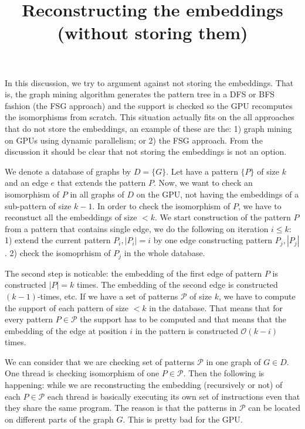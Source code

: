 \documentclass[a4paper,11pt]{article}
\title{Reconstructing the embeddings (without storing them)}
\date{}
\def\pattern{P}
\def\patternset{\mathcal{P}}
\def\edge{e}
\def\graph{G}
\def\db{D}
\def\bigoh{\mathcal{O}}
\begin{document}
\maketitle

In this discussion, we try to argument against not storing the embeddings.
That is, the graph mining algorithm generates the pattern tree in a DFS or BFS fashion (the FSG approach) and the support is checked so the GPU recomputes the isomorphisms from scratch.
This situation actually fits on the all approaches that do not store the embeddings, an example of these are the:
1) graph mining on GPUs using dynamic parallelism; or
2) the FSG approach.
From the discussion it should be clear that not storing the embeddings is not an option.


We denote a database of graphs by $\db=\{\graph\}$.
Let have a pattern $\{\pattern\}$ of size $k$ and an edge $\edge$ that extends the pattern $\pattern$.
Now, we want to check an isomorphism of $\pattern$ in all graphs of $\db$ on the GPU, not having the embeddings of a sub-pattern of size $k-1$.
In order to check the isomorphism of $\pattern$, we have to reconstuct all the embeddings of size $<k$.
We start construction of the pattern $\pattern$ from a pattern that contains single edge, we do the following on iteration $i \leq k$:
1) extend the current pattern  $\pattern_i, |\pattern_i| = i$ by one edge constructing pattern $\pattern_j, |\pattern_j|$.
2) check the isomoprhism of $\pattern_j$ in the whole database.

The second step is noticable: the embedding of the first edge of pattern $\pattern$ is constructed $|\pattern|=k$ times.
The embedding of the second edge is constructed $(k-1)$-times, etc.
If we have a set of patterns $\patternset$ of size $k$, we have to compute the support of each pattern of size $<k$ in the database.
That means that for every pattern $\pattern\in\patternset$ the support has to be computed and that means that the embedding of the edge at position $i$ in the pattern is constructed $\bigoh(k-i)$ times.

We can consider that we are checking set of patterns $\patternset$ in one graph of $\graph\in\db$.
One thread is checking isomorphism of one $\pattern\in\patternset$.
Then the following is happening:
while we are reconstructing the embedding (recursively or not) of each $\pattern\in\patternset$ each thread is basically executing its own set of instructions even that they share the same program.
The reason is that the patterns in $\patternset$ can be located on different parts of the graph $\graph$.
This is pretty bad for the GPU.
\end{document}

